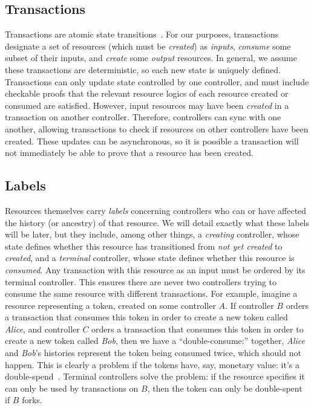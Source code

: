 \documentclass[a4paper,USenglish,cleveref, autoref, thm-restate, anonymous]{lipics-v2021}
\begin{document}
\subsection{Transactions}
Transactions are atomic state transitions~\cite{smr,statemachine}.
For our purposes, transactions designate a set of resources (which must be \emph{created}) as \emph{inputs}, \emph{consume} some subset of their inputs, and \emph{create} some \emph{output} resources.
In general, we assume these transactions are deterministic, so each new state is uniquely defined.
Transactions can only update state controlled by one controller, and must include checkable proofs that the relevant resource logics of each resource created or consumed are satisfied.
However, input resources may have been \emph{created} in a transaction on another controller.
Therefore, controllers can sync with one another, allowing transactions to check if resources on other controllers have been created.
These updates can be asynchronous, so it is possible a transaction will not immediately be able to prove that a resource has been created.

\subsection{Labels}
Resources themselves carry \emph{labels} concerning controllers who can or have affected the history (or ancestry) of that resource.
We will detail exactly what these labels will be later, but they include, among other things,
 a \emph{creating} controller, whose state defines whether this resource has transitioned from \emph{not yet created} to \emph{created}, and a \emph{terminal} controller, whose state defines whether this resource is \emph{consumed}.
Any transaction with this resource as an input must be ordered by its terminal controller.
This ensures there are never two controllers trying to consume the same resource with different transactions.
For example, imagine a resource representing a token, created on some controller $A$.
If controller $B$ orders a transaction that consumes this token in order to create a new token called \emph{Alice}, and controller $C$ orders a transaction that consumes this token in order to create a new token called \emph{Bob}, then we have a ``double-consume:'' together, \emph{Alice} and \emph{Bob}'s histories represent the token being consumed twice, which should not happen.
This is clearly a problem if the tokens have, say, monetary value: it's a double-spend~\cite{citation-needed}.
Terminal controllers solve the problem: if the resource specifies it can only be used by transactions on $B$, then the token can only be double-spent if $B$ forks.
\end{document}
